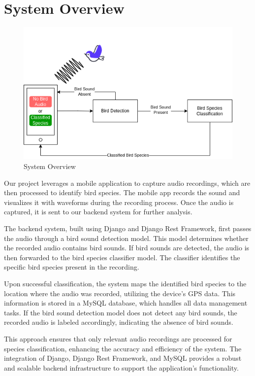 \section{System Overview}
\begin{figure}[h!]
    \centering
    \includegraphics[scale=0.65]{images/System Overview.png}
    \caption{System Overview}%
\end{figure}

Our project leverages a mobile application to capture audio recordings, which
are then processed to identify bird species. The mobile app records the sound
and visualizes it with waveforms during the recording process. Once the audio
is captured, it is sent to our backend system for further analysis.

The backend system, built using Django and Django Rest Framework, first passes
the audio through a bird sound detection model. This model determines whether
the recorded audio contains bird sounds. If bird sounds are detected, the audio
is then forwarded to the bird species classifier model. The classifier
identifies the specific bird species present in the recording.

Upon successful classification, the system maps the identified bird species to
the location where the audio was recorded, utilizing the device's GPS data.
This information is stored in a MySQL database, which handles all data
management tasks. If the bird sound detection model does not detect any bird
sounds, the recorded audio is labeled accordingly, indicating the absence of
bird sounds.

This approach ensures that only relevant audio recordings are processed for
species classification, enhancing the accuracy and efficiency of the system.
The integration of Django, Django Rest Framework, and MySQL provides a robust
and scalable backend infrastructure to support the application's functionality.
\\


